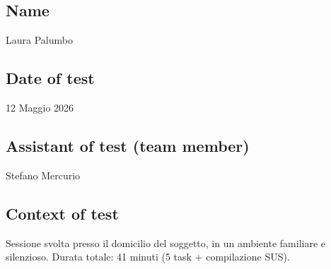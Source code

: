 ﻿\documentclass[11pt,a4paper]{article}
\begin{document}
\vspace{0.5cm}

\subsection*{Name}
\begin{tcolorbox}[base]
Laura Palumbo
\end{tcolorbox}

\subsection*{Date of test}
\begin{tcolorbox}[base]
12 Maggio 2026
\end{tcolorbox}

\subsection*{Assistant of test (team member)}
\begin{tcolorbox}[base]
Stefano Mercurio
\end{tcolorbox}

\subsection*{Context of test}
\begin{tcolorbox}[base]
Sessione svolta presso il domicilio del soggetto, in un
ambiente familiare e silenzioso. Durata totale: 41 minuti
(5 task + compilazione SUS).
\end{tcolorbox}
\end{document}
